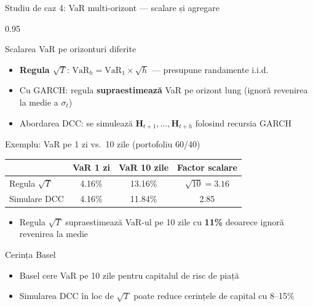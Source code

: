 \documentclass[9pt, aspectratio=169, t]{beamer}
\begin{document}
\begin{frame}{Studiu de caz 4: VaR multi-orizont --- scalare și agregare}
    \begin{cminipage}{0.95\textwidth}
    {\footnotesize
    \begin{block}{Scalarea VaR pe orizonturi diferite}
        \begin{itemize}\setlength{\itemsep}{0pt}
            \item \textbf{Regula $\sqrt{T}$}: $\text{VaR}_h = \text{VaR}_1 \times \sqrt{h}$ --- presupune randamente i.i.d.
            \item Cu GARCH: regula \textbf{supraestimează} VaR pe orizont lung (ignoră revenirea la medie a $\sigma_t$)
            \item Abordarea DCC: se simulează $\mathbf{H}_{t+1}, \ldots, \mathbf{H}_{t+h}$ folosind recursia GARCH
        \end{itemize}
    \end{block}
    \vspace{-2mm}
    \begin{exampleblock}{Exemplu: VaR pe 1 zi vs.\ 10 zile (portofoliu 60/40)}
        {\small
        \begin{center}
        \begin{tabular}{l|cc|c}
            \hline
            & \textbf{VaR 1 zi} & \textbf{VaR 10 zile} & \textbf{Factor scalare} \\
            \hline
            Regula $\sqrt{T}$   & 4.16\% & 13.16\% & $\sqrt{10} = 3.16$ \\
            Simulare DCC        & 4.16\% & 11.84\% & 2.85 \\
            \hline
        \end{tabular}
        \end{center}
        }
        \begin{itemize}\setlength{\itemsep}{0pt}
            \item Regula $\sqrt{T}$ supraestimează VaR-ul pe 10 zile cu \textbf{11\%} deoarece ignoră revenirea la medie
        \end{itemize}
    \end{exampleblock}
    \vspace{-2mm}
    \begin{alertblock}{Cerința Basel}
        \begin{itemize}\setlength{\itemsep}{0pt}
            \item Basel cere VaR pe 10 zile pentru capitalul de risc de piață
            \item Simularea DCC în loc de $\sqrt{T}$ poate reduce cerințele de capital cu 8--15\%
        \end{itemize}
    \end{alertblock}
    }
    \end{cminipage}
\end{frame}
\end{document}
